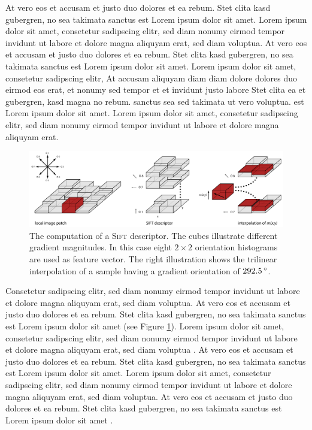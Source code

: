 At vero eos et accusam et justo duo dolores et ea rebum. Stet clita kasd gubergren, no sea takimata sanctus est Lorem ipsum dolor sit amet. Lorem ipsum dolor sit amet, consetetur sadipscing elitr, sed diam nonumy eirmod tempor invidunt ut labore et dolore magna aliquyam erat, sed diam voluptua. At vero eos et accusam et justo duo dolores et ea rebum. Stet clita kasd gubergren, no sea takimata sanctus est Lorem ipsum dolor sit amet. Lorem ipsum dolor sit amet, consetetur sadipscing elitr, At accusam aliquyam diam diam dolore dolores duo eirmod eos erat, et nonumy sed tempor et et invidunt justo labore Stet clita ea et gubergren, kasd magna no rebum. sanctus sea sed takimata ut vero voluptua. est Lorem ipsum dolor sit amet. Lorem ipsum dolor sit amet, consetetur sadipscing elitr, sed diam nonumy eirmod tempor invidunt ut labore et dolore magna aliquyam erat.

\begin{figure}[htb]
	\centering
	\includegraphics[width = \textwidth]{img/sift_descriptor.pdf}
	\caption[\textsc{Sift} Descriptor]{The computation of a \textsc{Sift} descriptor. The cubes illustrate different gradient magnitudes. In this case eight $2\times2$ orientation histograms are used as feature vector. The right illustration shows the trilinear interpolation of a sample having a gradient orientation of $292.5\,^\circ$.}
	\label{fig:sift}
\end{figure}

Consetetur sadipscing elitr, sed diam nonumy eirmod tempor invidunt ut labore et dolore magna aliquyam erat, sed diam voluptua. At vero eos et accusam et justo duo dolores et ea rebum. Stet clita kasd gubergren, no sea takimata sanctus est Lorem ipsum dolor sit amet (see Figure \ref{fig:sift}). Lorem ipsum dolor sit amet, consetetur sadipscing elitr, sed diam nonumy eirmod tempor invidunt ut labore et dolore magna aliquyam erat, sed diam voluptua \cite{low-04}. At vero eos et accusam et justo duo dolores et ea rebum. Stet clita kasd gubergren, no sea takimata sanctus est Lorem ipsum dolor sit amet. Lorem ipsum dolor sit amet, consetetur sadipscing elitr, sed diam nonumy eirmod tempor invidunt ut labore et dolore magna aliquyam erat, sed diam voluptua. At vero eos et accusam et justo duo dolores et ea rebum. Stet clita kasd gubergren, no sea takimata sanctus est Lorem ipsum dolor sit amet \cite{mik-05}.

